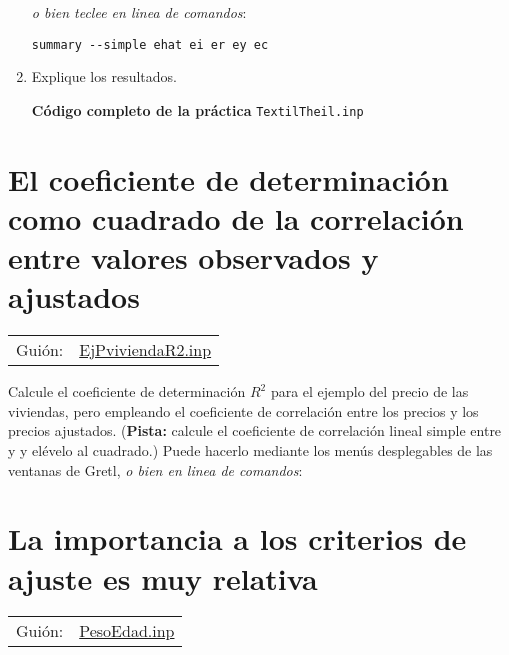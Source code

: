 \documentclass[11pt]{article}
\begin{document}
\begin{enumerate}
{\vspace{3pt} \color{gray!70!black}
\emph{o bien teclee en linea de comandos}:
\begin{verbatim}
summary --simple ehat ei er ey ec
\end{verbatim}
}

\item Explique los resultados.
\label{sec:org55fdf3e}


\vspace{16pt}
\noindent
\textbf{Código completo de la práctica} \texttt{TextilTheil.inp}
\vspace{10pt}

\clearpage
\end{enumerate}


\section{El coeficiente de determinación como cuadrado de la correlación entre valores observados y ajustados}
\label{sec:orge6215fa}
\begin{center}
\begin{tabular}{ll}
Guión: & \href{https://github.com/mbujosab/Ectr/tree/master/Practicas/Gretl/scripts/EjPviviendaR2.inp}{EjPviviendaR2.inp}\\[0pt]
\end{tabular}
\end{center}

Calcule el coeficiente de determinación \(R^2\) para el ejemplo del
precio de las viviendas, pero empleando el coeficiente de correlación
entre los precios y los precios ajustados.  (\textbf{Pista:} calcule
el coeficiente de correlación lineal simple entre  y
 y elévelo al cuadrado.) Puede hacerlo mediante los menús
desplegables de las ventanas de Gretl, \emph{o bien en linea de comandos}:

\vspace{16pt}
{\vspace{3pt} \color{gray!70!black}
}



\clearpage


\section{La importancia a los criterios de ajuste es muy relativa}
\label{sec:orge2f9a95}
\begin{center}
\begin{tabular}{ll}
Guión: & \href{https://github.com/mbujosab/Ectr/tree/master/Practicas/Gretl/scripts/PesoEdad.inp}{PesoEdad.inp}\\[0pt]
\end{tabular}
\end{center}
\end{document}
